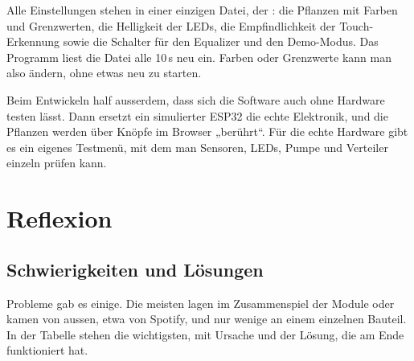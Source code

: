 \documentclass[11pt,a4paper]{article}
\begin{document}
Alle Einstellungen stehen in einer einzigen Datei, der : die Pflanzen mit Farben und Grenzwerten, die Helligkeit der LEDs, die Empfindlichkeit der Touch-Erkennung sowie die Schalter für den Equalizer und den Demo-Modus. Das Programm liest die Datei alle 10\,s neu ein. Farben oder Grenzwerte kann man also ändern, ohne etwas neu zu starten.

Beim Entwickeln half ausserdem, dass sich die Software auch ohne Hardware testen lässt. Dann ersetzt ein simulierter ESP32 die echte Elektronik, und die Pflanzen werden über Knöpfe im Browser „berührt“. Für die echte Hardware gibt es ein eigenes Testmenü, mit dem man Sensoren, LEDs, Pumpe und Verteiler einzeln prüfen kann.

\section{Reflexion}

\subsection{Schwierigkeiten und Lösungen}

Probleme gab es einige. Die meisten lagen im Zusammenspiel der Module oder kamen von aussen, etwa von Spotify, und nur wenige an einem einzelnen Bauteil. In der Tabelle stehen die wichtigsten, mit Ursache und der Lösung, die am Ende funktioniert hat.
\end{document}
